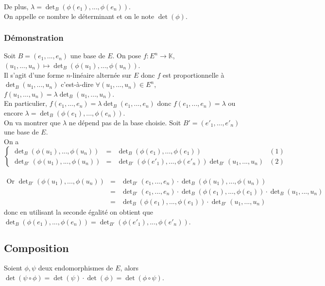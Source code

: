 \documentclass[a4paper,10pt]{book} %
\newcommand{\K}{\mathbb{K}}
\begin{document}
De plus, $\lambda=\det_B(\phi(e_1),...,\phi(e_n))$.\\

On appelle ce nombre le déterminant et on le note $\det(\phi)$.

\subsubsection{Démonstration}
Soit $B=(e_1,...,e_n)$ une base de $E$. On pose $f: E^n\rightarrow \K$, $(u_1,...,u_n)\mapsto\det_{B}(\phi(u_1),...,\phi(u_n))$.\\

Il s'agit d'une forme $n$-linéaire alternée sur $E$ donc $f$ est proportionnelle à $\det_B(u_1,...,u_n)$ c'est-à-dire $\forall (u_1,...,u_n)\in E^n$, $f(u_1,...,u_n)=\lambda\det_B(u_1,...,u_n)$.\\

En particulier, $f(e_1,...,e_n)=\lambda \det_B(e_1,...,e_n)$ donc $f(e_1,...,e_n)=\lambda$ ou encore $\lambda=\det_B(\phi(e_1),...,\phi(e_n))$.\\

On va montrer que $\lambda$ ne dépend pas de la base choisie. Soit $B'=(e'_1,...,e'_n)$ une base de $E$.\\

On a $\left\{\begin{array}{rcll}
\det_B(\phi(u_1),...,\phi(u_n))&=&\det_B(\phi(e_1),...,\phi(e_1))&(1) \\
\det_{B'}(\phi(u_1),...,\phi(u_n))&=&\det_{B'}(\phi(e'_1),...,\phi(e'_n))\det_{B'}(u_1,...,u_n)&(2)
\end{array}\right.$\\\\

$\begin{array}{rcl}\text{Or }\det_{B'}(\phi(u_1),...,\phi(u_n))&=&\det_{B'}(e_1,...,e_n)\cdot \det_B(\phi(u_1),...,\phi(u_n))\\
&=&\det_{B'}(e_1,...,e_n)\cdot \det_B(\phi(e_1),...,\phi(e_1))\cdot \det_B(u_1,...,u_n)\\
&=& \det_B(\phi(e_1),...,\phi(e_1))\cdot \det_{B'}(u_1,...,u_n)\end{array}$\\

donc en utilisant la seconde égalité on obtient que $\det_B(\phi(e_1),...,\phi(e_n))=\det_{B'}(\phi(e'_1),...,\phi(e'_n))$.

\vfill

\subsection{Composition}
Soient $\phi,\psi$ deux endomorphismes de $E$, alors $\det(\psi\circ\phi)=\det(\psi)\cdot \det(\phi)=\det(\phi\circ \psi)$.
\end{document}
